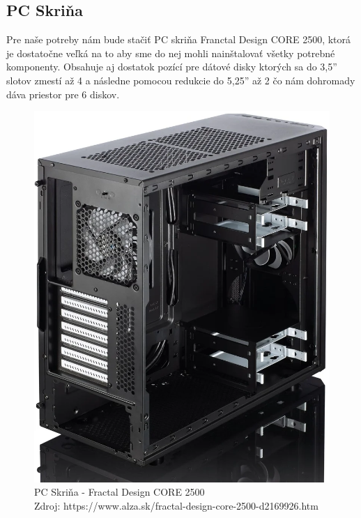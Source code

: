 \documentclass[12pt,oneside,slovak,a4paper]{article}
\begin{document}
\subsection{PC Skriňa}
Pre naše potreby nám bude stačiť PC skriňa Franctal Design CORE 2500, ktorá je dostatočne veľká na to aby sme do nej mohli nainštalovať všetky potrebné komponenty. Obsahuje aj dostatok pozící pre dátové disky ktorých sa do 3,5'' slotov zmestí až 4 a následne pomocou redukcie do 5,25'' až 2 čo nám dohromady dáva priestor pre 6 diskov.

\begin{figure}[H]
	\centering
	\captionsetup{justification=centering,margin=2cm}
	\includegraphics[width=\linewidth]{./images/case.png} %
	\centering
	\caption{PC Skriňa - Fractal Design CORE 2500 \\ Zdroj: https://www.alza.sk/fractal-design-core-2500-d2169926.htm}
\end{figure}
\end{document}
